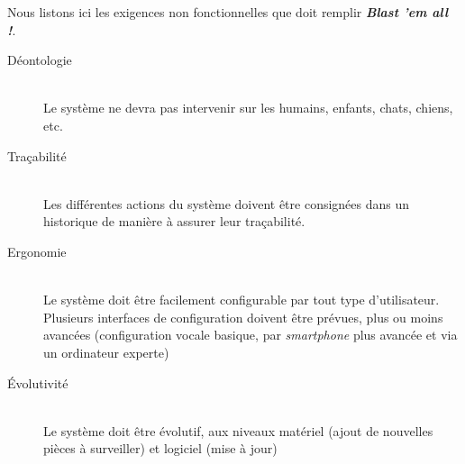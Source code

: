 Nous listons ici les exigences non fonctionnelles que doit remplir 
\textit{\textbf{Blast 'em all !}}.
\begin{description}
\item[Déontologie]\hfill\\
Le système ne devra pas intervenir sur les humains, enfants, chats, chiens, etc.
\item[Traçabilité]\hfill\\
Les différentes actions du système doivent être consignées dans un
historique de manière à assurer leur traçabilité.
\item[Ergonomie]\hfill\\
Le système doit être facilement configurable par tout type d'utilisateur.
Plusieurs interfaces de configuration doivent être prévues, plus ou moins
avancées (configuration vocale basique, par {\sl smartphone} plus avancée et via
un ordinateur experte)
\item[Évolutivité]\hfill\\
Le système doit être évolutif, aux niveaux matériel (ajout de nouvelles
pièces à surveiller) et logiciel (mise à jour)
\end{description}

\vfill
\pagebreak
